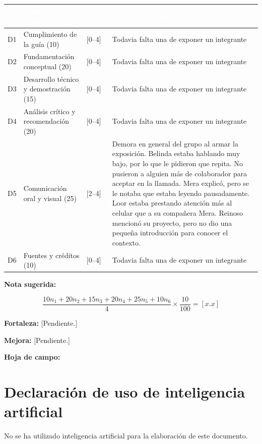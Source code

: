 \documentclass[11pt,a4paper]{article}
\newcommand{\hdr}[1]{\textcolor{white}{\textbf{#1}}}
\begin{document}
\begin{tabularx}{\linewidth}{|C{0.9cm}|L{3.4cm}|C{1.1cm}|Y|}
    \hline
    \hdr{D} & \hdr{Dimensión (peso)} & \hdr{Nivel} &
    \hdr{Evidencia concreta observada} \\
    \hline

    D1 & Cumplimiento de la guía (10) & [0--4] &
    Todavia falta una de exponer un integrante\\
    \hline

    D2 & Fundamentación conceptual (20) & [0--4] &
    Todavia falta una de exponer un integrante\\
    \hline

    D3 & Desarrollo técnico y demostración  (15) & [0--4] &
    Todavia falta una de exponer un integrante \\
    \hline

    D4 & Análisis crítico y recomendación (20) & [0--4] &
    Todavia falta una de exponer un integrante\\
    \hline

    D5 & Comunicación oral y visual (25) & [2--4] &
    Demora en general del grupo al armar la exposición.
    Belinda estaba hablando muy bajo, por lo que le pidieron
    que repita. No pusieron a alguien más de colaborador
    para aceptar en la llamada. Mera explicó, pero se le
    notaba que estaba leyendo pausadamente. Loor estaba
    prestando atención más al celular que a su compañera Mera.
    Reinoso mencionó su proyecto, pero no dio una pequeña
    introducción para conocer el contexto. \\
    \hline

    D6 & Fuentes y créditos (10) & [0--4] &
    Todavia falta una de exponer un integrante\\
    \hline

\end{tabularx}

\textbf{Nota sugerida:}

\[
    \frac{
        10n_1+20n_2+15n_3+20n_4+25n_5+10n_6
    }{4}
    \times \frac{10}{100}
    = [x.x]
\]

\textbf{Fortaleza:} [Pendiente.]

\textbf{Mejora:} [Pendiente.]

\textbf{Hoja de campo:}


\clearpage


\section*{Declaración de uso de inteligencia artificial}

No se ha utilizado inteligencia artificial para la elaboración de este documento.
\end{document}
